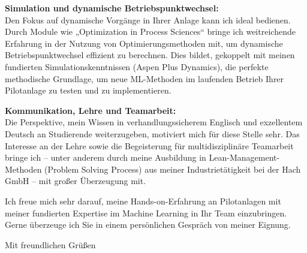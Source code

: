 \documentclass[11pt,a4paper]{moderncv} %
\begin{document}
\textbf{Simulation und dynamische Betriebspunktwechsel:}\\
Den Fokus auf dynamische Vorgänge in Ihrer Anlage kann ich ideal bedienen. Durch Module wie „Optimization in Process Sciences“ bringe ich weitreichende Erfahrung in der Nutzung von Optimierungsmethoden mit, um dynamische Betriebspunktwechsel effizient zu berechnen. Dies bildet, gekoppelt mit meinen fundierten Simulationskenntnissen (Aspen Plus Dynamics), die perfekte methodische Grundlage, um neue ML-Methoden im laufenden Betrieb Ihrer Pilotanlage zu testen und zu implementieren.

\textbf{Kommunikation, Lehre und Teamarbeit:}\\
Die Perspektive, mein Wissen in verhandlungssicherem Englisch und exzellentem Deutsch an Studierende weiterzugeben, motiviert mich für diese Stelle sehr. Das Interesse an der Lehre sowie die Begeisterung für multidisziplinäre Teamarbeit bringe ich – unter anderem durch meine Ausbildung in Lean-Management-Methoden (Problem Solving Process) aus meiner Industrietätigkeit bei der Hach GmbH – mit großer Überzeugung mit. 

Ich freue mich sehr darauf, meine Hands-on-Erfahrung an Pilotanlagen mit meiner fundierten Expertise im Machine Learning in Ihr Team einzubringen. Gerne überzeuge ich Sie in einem persönlichen Gespräch von meiner Eignung.



\closing{Mit freundlichen Grüßen}
\makeletterclosing
\end{document}
